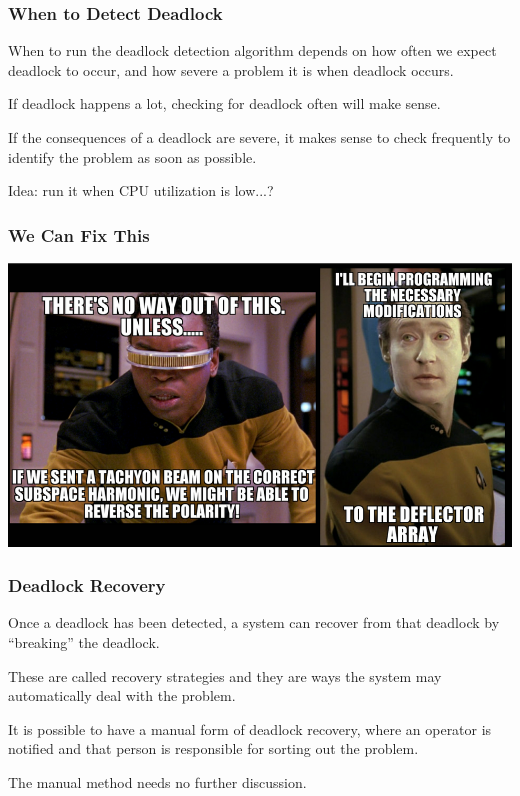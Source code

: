 \begin{frame}
	\frametitle{When to Detect Deadlock}

	When to run the deadlock detection algorithm depends on how often we expect deadlock to occur, and how severe a problem it is when deadlock occurs.

	If deadlock happens a lot, checking for deadlock often will make sense.

	If the consequences of a deadlock are severe, it makes sense to check frequently to identify the problem as soon as possible.

	Idea: run it when CPU utilization is low...?

\end{frame}


\begin{frame}
	\frametitle{We Can Fix This}

	\begin{center}
		\includegraphics[width=\textwidth]{images/recovery.png}
	\end{center}

\end{frame}


\begin{frame}
	\frametitle{Deadlock Recovery}

	Once a deadlock has been detected, a system can recover from that deadlock by ``breaking'' the deadlock.

	These are called recovery strategies and they are ways the system may automatically deal with the problem.

	It is possible to have a manual form of deadlock recovery, where an operator is notified and that person is responsible for sorting out the problem.

	The manual method needs no further discussion.


\end{frame}

